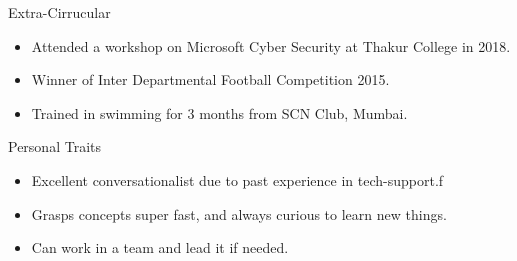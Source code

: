 \documentclass{resume} %
\begin{document}
\begin{rSection}{Extra-Cirrucular} \itemsep -3pt

\begin{itemize} 
		\item Attended a workshop on Microsoft Cyber Security at Thakur College in 2018.
		\item Winner of Inter Departmental Football Competition 2015.
		\item Trained in swimming for 3 months from SCN Club, Mumbai.
\end{itemize}



\end{rSection}

\begin{rSection}{Personal Traits}

\begin{itemize} 
		\item Excellent conversationalist due to past experience in tech-support.f
		\item  Grasps concepts super fast, and always curious to learn new things.
		\item Can work in a team and lead it if needed.
\end{itemize}
\end{rSection}
\end{document}
